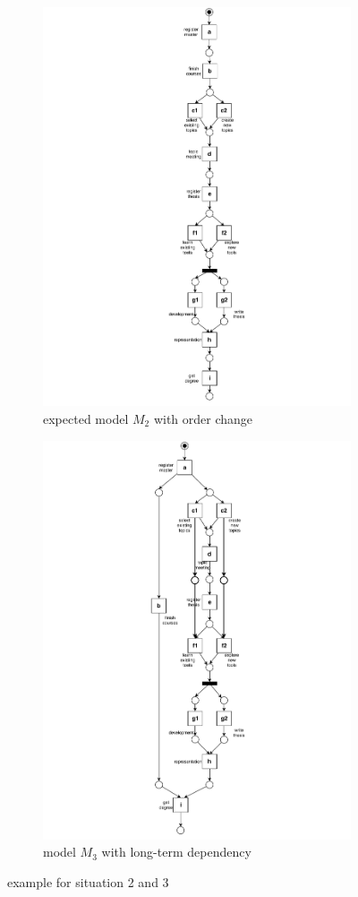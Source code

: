 \begin{figure}[htp]
	\centering
	\begin{subfigure}[b]{0.5\textwidth}
		\centering
		\includegraphics[clip, trim=8cm 0cm 8cm 0cm, width=0.5\linewidth, height=0.7\textheight]{figures/introduction/Master-change-order.pdf}
		\caption{expected model $M_{2}$ with order change}
		\label{fig:model_c}
	\end{subfigure}%
	\begin{subfigure}[b]{0.5\textwidth}
		\centering
		\includegraphics[clip, trim=7cm 0cm 7cm 0cm, width=0.5\linewidth, height=0.7\textheight]{figures/introduction/Master-with-lt.pdf}
		\caption{model $M_{3}$ with long-term dependency}
		\label{fig:model_d}
	\end{subfigure}
	\caption{example for situation 2 and 3}
	\label{fig:model_changes_2_3}
\end{figure}
